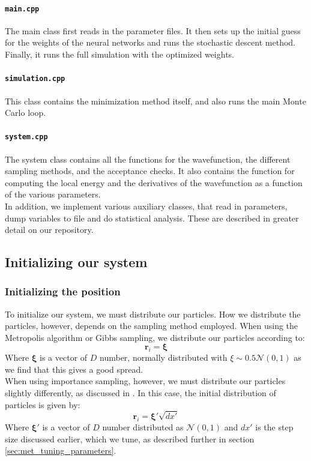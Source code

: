 \documentclass[a4paper, 10pt]{article}
\begin{document}
	\paragraph{\texttt{main.cpp}}
	The main class first reads in the parameter files. It then sets up the initial guess for the weights of the neural networks and runs the stochastic descent method. Finally, it runs the full simulation with the optimized weights.\\
	\paragraph{\texttt{simulation.cpp}}
	This class contains the minimization method itself, and also runs the main Monte Carlo loop.
	\paragraph{\texttt{system.cpp}}
	The system class contains all the functions for the wavefunction, the different sampling methods, and the acceptance checks. It also contains the function for computing the local energy and the derivatives of the wavefunction as a function of the various parameters.\\
	\linebreak
	In addition, we implement various auxiliary classes, that read in parameters, dump variables to file and do statistical analysis. These are described in greater detail on our repository.
	\subsection{Initializing our system}\label{sec:Initialization}
	\subsubsection{Initializing the position}
	To initialize our system, we must distribute our particles. How we distribute the particles, however, depends on the sampling method employed. When using the Metropolis algorithm or Gibbs sampling, we distribute our particles according to:
	\begin{equation}
	\boldsymbol{r}_i=\boldsymbol{\xi}
	\end{equation}
	Where $\boldsymbol{\xi}$ is a vector of $D$ number, normally distributed with $\xi \sim 0.5\mathcal{N}(0,1)$ as we find that this gives a good spread.\\
	\linebreak
	When using importance sampling, however, we must distribute our particles slightly differently, as discussed in \cite{Hjorth-Jensen2015}. In this case, the initial distribution of particles is given by:
	\begin{equation}
	\boldsymbol{r}_i=\boldsymbol{\xi'}\sqrt{dx'}
	\end{equation}
	Where $\boldsymbol{\xi'}$ is a vector of $D$ number distributed as $\mathcal{N}(0,1)$ and $dx'$ is the step size discussed earlier, which we tune, as described further in section \ref{sec:met_tuning_parameters}.
\end{document}
